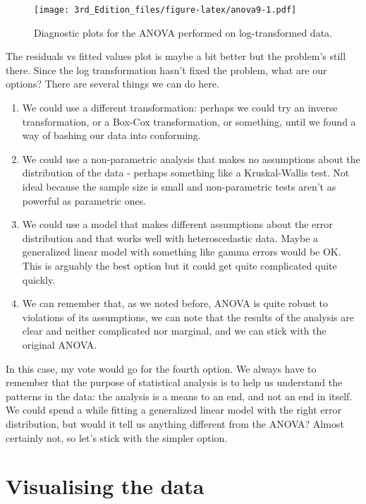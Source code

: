 \documentclass[
]{book}
\providecommand{\tightlist}{%
  \setlength{\itemsep}{0pt}\setlength{\parskip}{0pt}}
\begin{document}
\begin{figure}
\centering
\texttt{[image: 3rd\_Edition\_files/figure-latex/anova9-1.pdf]}
\caption{\label{fig:anova9}Diagnostic plots for the ANOVA performed on log-transformed data.}
\end{figure}

The residuals vs fitted values plot is maybe a bit better but the problem's still there. Since the log transformation hasn't fixed the problem, what are our options? There are several things we can do here.

\begin{enumerate}
\def\labelenumi{\arabic{enumi}.}
\tightlist
\item
  We could use a different transformation: perhaps we could try an inverse transformation, or a Box-Cox transformation, or something, until we found a way of bashing our data into conforming.
\item
  We could use a non-parametric analysis that makes no assumptions about the distribution of the data - perhaps something like a Kruskal-Wallis test. Not ideal because the sample size is small and non-parametric tests aren't as powerful as parametric ones.
\item
  We could use a model that makes different assumptions about the error distribution and that works well with heteroscedastic data. Maybe a generalized linear model with something like gamma errors would be OK. This is arguably the best option but it could get quite complicated quite quickly.
\item
  We can remember that, as we noted before, ANOVA is quite robust to violations of its assumptions, we can note that the results of the analysis are clear and neither complicated nor marginal, and we can stick with the original ANOVA.
\end{enumerate}

In this case, my vote would go for the fourth option. We always have to remember that the purpose of statistical analysis is to help us understand the patterns in the data: the analysis is a means to an end, and not an end in itself. We could spend a while fitting a generalized linear model with the right error distribution, but would it tell us anything different from the ANOVA? Almost certainly not, so let's stick with the simpler option.

\hypertarget{visualising-the-data}{%
\section{Visualising the data}\label{visualising-the-data}}
\end{document}

